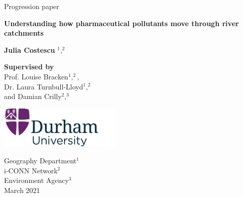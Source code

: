 \documentclass{article}
\begin{document}
\begin{titlepage}
    \begin{center}
          
        
        \LARGE
        Progression paper  
        \vspace{4cm}
        
        \Huge
        \textbf{Understanding how pharmaceutical pollutants move through river catchments}
            
        \vspace{1cm}
        
        \LARGE    
        \textbf{Julia Costescu} 
        $^1,^2$\\
        
        \vspace{1cm}
        
        \normalsize
        \textbf{         Supervised by}\\
        
         Prof. Louise Bracken$^1,^2$,\\
            Dr. Laura Turnbull-Lloyd$^1,^2$ \\
            and Damian Crilly$^2,^3$\\
        
        
        \vspace{1cm}
            
        \includegraphics[height=2cm]{logo.png}
            
        \Large
        Geography Department$^1$\\
        i-CONN Network$^2$\\
        Environment Agency$^3$\\
        \vspace{1cm}
        March 2021
            
    \end{center}


\end{titlepage}
\end{document}

